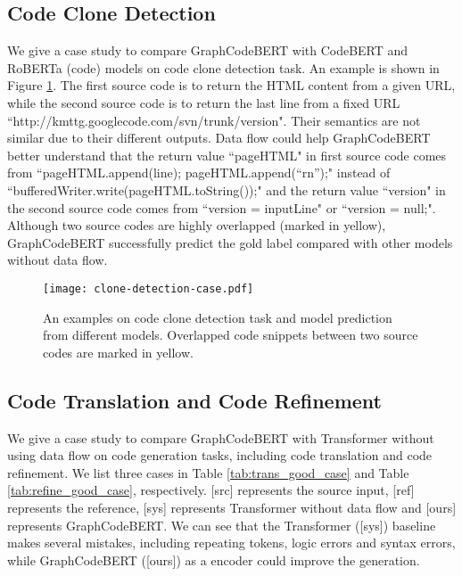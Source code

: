 \documentclass{article} \usepackage{iclr2021_conference,times}
\begin{document}
\subsection{Code Clone Detection}
We give a case study to compare GraphCodeBERT with CodeBERT and RoBERTa (code) models on code clone detection task. An example is shown in Figure \ref{fig:clone-detection-case-study}. The  first source code is to return the HTML content from a given URL, while the second source code is to return the last line from a fixed URL ``http://kmttg.googlecode.com/svn/trunk/version". Their semantics are not similar due to their different outputs.
Data flow could help GraphCodeBERT better understand that the return value ``pageHTML" in first source code comes from ``pageHTML.append(line); pageHTML.append(``rn'');" instead of ``bufferedWriter.write(pageHTML.toString());" and the return value ``version" in the second source code comes from ``version = inputLine" or ``version = null;".
Although two source codes are highly overlapped (marked in yellow), GraphCodeBERT  successfully predict the gold label compared with other models without data flow. 
\begin{figure}[h]
\begin{center}
		\texttt{[image: clone-detection-case.pdf]}
		\caption{An examples on code clone detection task and model prediction from different models. Overlapped code snippets between two source codes are marked in yellow.}
		\label{fig:clone-detection-case-study}
	\end{center}
\end{figure}




\subsection{Code Translation and Code Refinement}
We give a case study to compare GraphCodeBERT with Transformer without using data flow on code generation tasks, including code translation and code refinement. We list three cases in Table \ref{tab:trans_good_case} and Table \ref{tab:refine_good_case}, respectively. [src] represents the source input, [ref] represents the reference, [sys] represents Transformer without data flow and [ours] represents GraphCodeBERT. We can see that the Transformer ([sys]) baseline makes several mistakes, including repeating tokens, logic errors and syntax errors, while GraphCodeBERT ([ours]) as a encoder could improve the generation.
\end{document}
